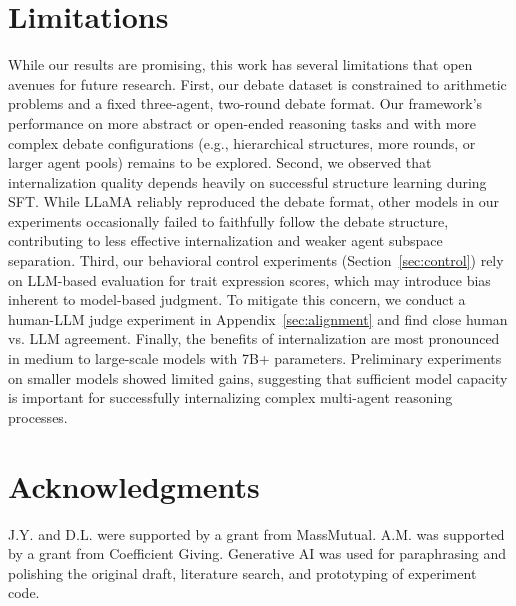 \documentclass[11pt]{article}
\begin{document}
\section*{Limitations}
While our results are promising, this work has several limitations that open avenues for future research. 
First, our debate dataset is constrained to arithmetic problems and a fixed three-agent, two-round debate format. Our framework's performance on more abstract or open-ended reasoning tasks and with more complex debate configurations (e.g., hierarchical structures, more rounds, or larger agent pools) remains to be explored. 
Second, we observed that internalization quality depends heavily on successful structure learning during SFT. While LLaMA reliably reproduced the debate format, other models in our experiments occasionally failed to faithfully follow the debate structure, contributing to less effective internalization and weaker agent subspace separation. 
Third, our behavioral control experiments (Section~\ref{sec:control}) rely on LLM-based evaluation for trait expression scores, which may introduce bias inherent to model-based judgment. To mitigate this concern, we conduct a human-LLM judge experiment in Appendix~\ref{sec:alignment} and find close human vs. LLM agreement.
Finally, the benefits of internalization are most pronounced in medium to large-scale models with 7B+ parameters. Preliminary experiments on smaller models showed limited gains, suggesting that sufficient model capacity is important for successfully internalizing complex multi-agent reasoning processes.


\section*{Acknowledgments}
 J.Y. and D.L. were supported by a grant from MassMutual. A.M. was supported by a grant from Coefficient Giving. Generative AI was used for paraphrasing and polishing the original draft, literature search, and prototyping of experiment code.

%


\appendix

\end{document}

